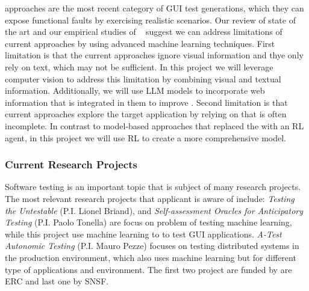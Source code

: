 
\smallskip 
\testreuse approaches are the most recent category of GUI test generations, which they can expose functional faults by exercising realistic scenarios.
Our review of state of the art and our empirical studies of \testreuse~\cite{mariani:SemFinder:ISSTA:2021,khalili:DomainEmbedding:ICPC:2022} suggest  we can address limitations of current approaches by using advanced machine learning techniques.
First limitation is that the current \testreuse approaches ignore visual information and thye only rely on text, which may not be sufficient. 
In this project we will leverage computer vision to address this limitation by combining visual and textual information.
Additionally, we will use LLM models to incorporate web information that is integrated in them to improve \testreuse. 
Second limitation is that current approaches explore the target application by relying on \tam that is often incomplete.
In contrast to model-based approaches that replaced the \tam with an RL agent, in this project we will use RL to create a more comprehensive model.


\subsubsection{Current Research Projects}

Software testing is an important topic that is subject of many research projects.
The most relevant research projects that applicant is aware of include:
\textit{Testing the Untestable} (P.I. Lionel Briand), and
\textit{Self-assessment Oracles for Anticipatory Testing} (P.I. Paolo Tonella) are focus on problem of testing machine learning, while this project use machine learning to to test GUI applications.
\textit{A-Test Autonomic Testing} (P.I. Mauro Pezze) focuses on testing distributed systems in the production environment, which also uses machine learning but for different type of applications and environment. 
The first two project are funded by are ERC and last one by SNSF.


